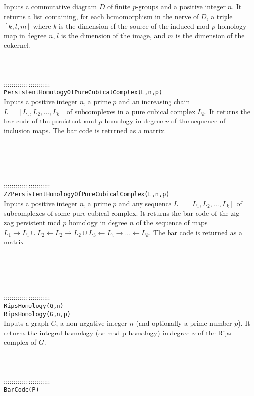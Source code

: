 \documentclass[a4paper,11pt]{report}
\begin{document}
{ Inputs a commutative diagram $D$ of finite $p$-groups and a positive integer $n$. It returns a list containing, for each homomorphism in the nerve of $D$, a triple $[k,l,m]$ where $k$ is the dimension of the source of the induced mod $p$ homology map in degree $n$, $l$ is the dimension of the image, and $m$ is the dimension of the cokernel. \\
 \\
 \\
 \\
 ::::::::::::::::::::::::\\
 \texttt{PersistentHomologyOfPureCubicalComplex(L,n,p)}\\
 

 Inputs a positive integer $n$, a prime $p$ and an increasing chain $L=[L_1, L_2, ..., L_k]$ of subcomplexes in a pure cubical complex $L_k$. It returns the bar code of the persistent mod $p$ homology in degree $n$ of the sequence of inclusion maps. The bar code is returned as a matrix. 

 \\
 \\
 \\
 \\
 ::::::::::::::::::::::::\\
 \texttt{ZZPersistentHomologyOfPureCubicalComplex(L,n,p)}\\
 

 Inputs a positive integer $n$, a prime $p$ and any sequence $L=[L_1, L_2, ..., L_k]$ of subcomplexes of some pure cubical complex. It returns the bar code of the
zig-zag persistent mod $p$ homology in degree $n$ of the sequence of maps $L_1 \rightarrow L_1 \cup L_2 \leftarrow L_2 \rightarrow L_2 \cup L_3
\leftarrow L_4 \rightarrow ... \leftarrow L_k$. The bar code is returned as a matrix. 

 \\
 \\
 \\
 \\
 ::::::::::::::::::::::::\\
 \texttt{RipsHomology(G,n)}\\
 \texttt{RipsHomology(G,n,p)}\\
 

 Inputs a graph $G$, a non-negative integer $n$ (and optionally a prime number $p$). It returns the integral homology (or mod p homology) in degree $n$ of the Rips complex of $G$. \\
 \\
 \\
 \\
 ::::::::::::::::::::::::\\
 \texttt{BarCode(P)}\\
 

}
\end{document}
